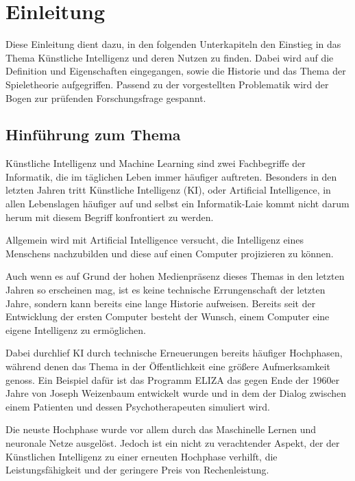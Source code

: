 
\chapter{Einleitung}
Diese Einleitung dient dazu, in den folgenden Unterkapiteln den Einstieg in das Thema Künstliche Intelligenz und deren Nutzen zu finden. Dabei wird auf die Definition und Eigenschaften eingegangen, sowie die Historie und das Thema der Spieletheorie aufgegriffen. Passend zu der vorgestellten Problematik wird der Bogen zur prüfenden Forschungsfrage gespannt.

\section{Hinführung zum Thema}
Künstliche Intelligenz und Machine Learning sind zwei Fachbegriffe der Informatik, die im täglichen Leben immer häufiger auftreten. Besonders in den letzten Jahren tritt Künstliche Intelligenz (\acs{KI}), oder Artificial Intelligence, in allen Lebenslagen häufiger auf und selbst ein Informatik-Laie kommt nicht darum herum mit diesem Begriff konfrontiert zu werden. 

Allgemein wird mit Artificial Intelligence versucht, die Intelligenz eines Menschens nachzubilden und diese auf einen Computer projizieren zu können.

Auch wenn es auf Grund der hohen Medienpräsenz dieses Themas in den letzten Jahren so erscheinen mag, ist es keine technische Errungenschaft der letzten Jahre, sondern kann bereits eine lange Historie aufweisen. Bereits seit der Entwicklung der ersten Computer besteht der Wunsch, einem Computer eine eigene Intelligenz zu ermöglichen.

Dabei durchlief KI durch technische Erneuerungen bereits häufiger Hochphasen, während denen das Thema in der Öffentlichkeit eine größere Aufmerksamkeit genoss. Ein Beispiel dafür ist das Programm ELIZA das gegen Ende der 1960er Jahre von Joseph Weizenbaum entwickelt wurde und in dem der Dialog zwischen einem Patienten und dessen Psychotherapeuten simuliert wird.\cite{Weizenbaum1966}


Die neuste Hochphase wurde vor allem durch das Maschinelle Lernen und neuronale Netze ausgelöst. Jedoch ist ein nicht zu verachtender Aspekt, der der Künstlichen Intelligenz zu einer erneuten Hochphase verhilft, die Leistungsfähigkeit und der geringere Preis von Rechenleistung. 

